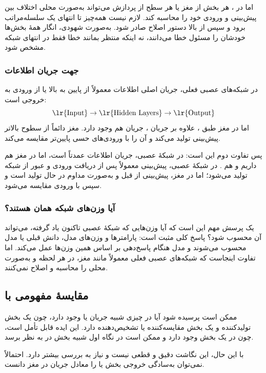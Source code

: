 اما در ، هر بخش از مغز یا هر سطح از پردازش می‌تواند به‌صورت محلی اختلاف بین پیش‌بینی و ورودی خود را محاسبه کند. لازم نیست همه‌چیز تا انتهای یک سلسله‌مراتب برود و سپس از بالا دستور اصلاح صادر شود. به‌صورت شهودی، انگار همهٔ بخش‌ها خودشان را مسئول خطا می‌دانند، نه اینکه منتظر بمانند خطا فقط در انتهای شبکه مشخص شود.

\subsubsection{جهت جریان اطلاعات}
در شبکه‌های عصبی فعلی، جریان اصلی اطلاعات معمولاً از پایین به بالا یا از ورودی به خروجی است:
\[
\text{\lr{Input}}\rightarrow \text{\lr{Hidden Layers}}\rightarrow \text{\lr{Output}}
\]
اما در مغز طبق ، علاوه بر جریان ، جریان  هم وجود دارد. مغز دائماً از سطوح بالاتر پیش‌بینی تولید می‌کند و آن را با ورودی‌های حسی پایین‌تر مقایسه می‌کند.

پس تفاوت دوم این است: در شبکهٔ عصبی، جریان اطلاعات عمدتاً  است، اما در مغز هم  داریم و هم . در شبکهٔ عصبی، پیش‌بینی معمولاً پس از دریافت ورودی و عبور از شبکه تولید می‌شود؛ اما در مغز، پیش‌بینی از قبل و به‌صورت مداوم در حال تولید است و سپس با ورودی مقایسه می‌شود.

\subsubsection{آیا وزن‌های شبکه همان  هستند؟}
یک پرسش مهم این است که آیا وزن‌هایی که شبکهٔ عصبی تاکنون یاد گرفته، می‌تواند  آن محسوب شود؟ پاسخ کلی مثبت است: پارامترها و وزن‌های مدل، دانش قبلی یا  مدل محسوب می‌شوند و مدل هنگام پاسخ‌دهی بر اساس همین وزن‌ها عمل می‌کند. اما تفاوت اینجاست که شبکه‌های عصبی فعلی معمولاً مانند مغز، در هر لحظه و به‌صورت محلی  را محاسبه و اصلاح نمی‌کنند.

\subsection{مقایسهٔ مفهومی با }
ممکن است پرسیده شود آیا در  چیزی شبیه جریان  یا  وجود دارد، چون  یک بخش تولیدکننده و یک بخش مقایسه‌کننده یا تشخیص‌دهنده دارد. این ایده قابل تأمل است، چون در  یک بخش  وجود دارد و ممکن است در نگاه اول شبیه بخش  در  به نظر برسد.

با این حال، این نگاشت دقیق و قطعی نیست و نیاز به بررسی بیشتر دارد. احتمالاً نمی‌توان به‌سادگی خروجی بخش  یا  را معادل جریان  در مغز دانست.

